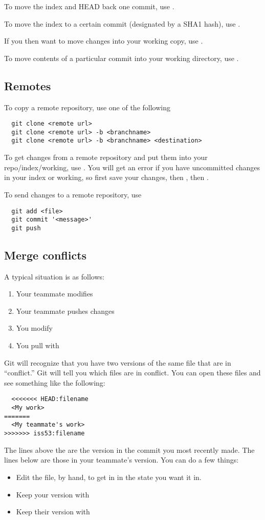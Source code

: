 To move the index and HEAD back one commit, use .  

To move the index to a certain commit (designated by a SHA1 hash), use .

If you then want to move changes into your working copy, use .

To move contents of a particular commit into your working directory, use .

\subsection{Remotes}
To copy a remote repository, use one of the following
\begin{verbatim}
  git clone <remote url>
  git clone <remote url> -b <branchname>
  git clone <remote url> -b <branchname> <destination>
\end{verbatim}

To get changes from a remote repository and put them into your repo/index/working, use .  You will get an error if you have uncommitted changes in your index or working, so first save your changes, then , then .

To send changes to a remote repository, use 
\begin{verbatim}
  git add <file>
  git commit '<message>'
  git push
\end{verbatim}

\subsection{Merge conflicts}
A typical situation is as follows:
\begin{enumerate}
  \item Your teammate modifies 
  \item Your teammate pushes changes
  \item You modify 
  \item You pull with 
\end{enumerate}
Git will recognize that you have two versions of the same file that are in ``conflict.''  Git will tell you which files are in conflict.  You can open these files and see something like the following:
\begin{verbatim}
  <<<<<<< HEAD:filename
  <My work>
=======
  <My teammate's work>
>>>>>>> iss53:filename
\end{verbatim}

The lines above the \T{=======} are the version in the commit you most recently made.  The lines below are those in your teammate's version.  You can do a few things:

\begin{itemize}
  \item Edit the file, by hand, to get in in the state you want it in.
  \item Keep your version with 
  \item Keep their version with 
\end{itemize}
